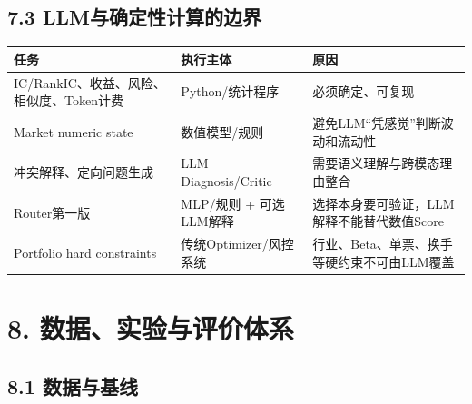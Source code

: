 \documentclass[12pt,a4paper]{ctexart}
\begin{document}
\subsection{\texorpdfstring{\textbf{7.3
LLM与确定性计算的边界}}{7.3 LLM与确定性计算的边界}}\label{llmux4e0eux786eux5b9aux6027ux8ba1ux7b97ux7684ux8fb9ux754c}

\begin{longtable}[]{@{}
  >{\raggedright\arraybackslash}p{}
  >{\raggedright\arraybackslash}p{}
  >{\raggedright\arraybackslash}p{}@{}}
\toprule\noalign{}
\begin{minipage}[b]{\linewidth}\centering
\textbf{任务}
\end{minipage} & \begin{minipage}[b]{\linewidth}\centering
\textbf{执行主体}
\end{minipage} & \begin{minipage}[b]{\linewidth}\centering
\textbf{原因}
\end{minipage} \\
\midrule\noalign{}
\endhead
\bottomrule\noalign{}
\endlastfoot
IC/RankIC、收益、风险、相似度、Token计费 & Python/统计程序 &
必须确定、可复现 \\
Market numeric state & 数值模型/规则 &
避免LLM``凭感觉''判断波动和流动性 \\
冲突解释、定向问题生成 & LLM Diagnosis/Critic &
需要语义理解与跨模态理由整合 \\
Router第一版 & MLP/规则 + 可选LLM解释 &
选择本身要可验证，LLM解释不能替代数值Score \\
Portfolio hard constraints & 传统Optimizer/风控系统 &
行业、Beta、单票、换手等硬约束不可由LLM覆盖 \\
\end{longtable}

\section{\texorpdfstring{\textbf{8.
数据、实验与评价体系}}{8. 数据、实验与评价体系}}\label{ux6570ux636eux5b9eux9a8cux4e0eux8bc4ux4ef7ux4f53ux7cfb}

\subsection{\texorpdfstring{\textbf{8.1
数据与基线}}{8.1 数据与基线}}\label{ux6570ux636eux4e0eux57faux7ebf}
\end{document}
